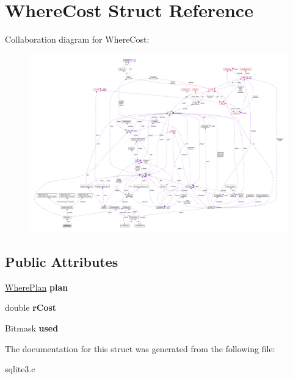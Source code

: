 \hypertarget{struct_where_cost}{\section{Where\-Cost Struct Reference}
\label{struct_where_cost}
}


Collaboration diagram for Where\-Cost\-:\nopagebreak
\begin{figure}[H]
\begin{center}
\leavevmode
\includegraphics[width=350pt]{struct_where_cost__coll__graph}
\end{center}
\end{figure}
\subsection*{Public Attributes}
\begin{DoxyCompactItemize}
\item 
\hypertarget{struct_where_cost_ace6ca770eb1f123bcbf2ce6433e69822}{\hyperlink{struct_where_plan}{Where\-Plan} {\bfseries plan}}\label{struct_where_cost_ace6ca770eb1f123bcbf2ce6433e69822}

\item 
\hypertarget{struct_where_cost_a4dba436b417d0d562e0a32519befa824}{double {\bfseries r\-Cost}}\label{struct_where_cost_a4dba436b417d0d562e0a32519befa824}

\item 
\hypertarget{struct_where_cost_ab041bae4d0f6cc76f427c82d3840bfae}{Bitmask {\bfseries used}}\label{struct_where_cost_ab041bae4d0f6cc76f427c82d3840bfae}

\end{DoxyCompactItemize}


The documentation for this struct was generated from the following file\-:\begin{DoxyCompactItemize}
\item 
sqlite3.\-c\end{DoxyCompactItemize}
